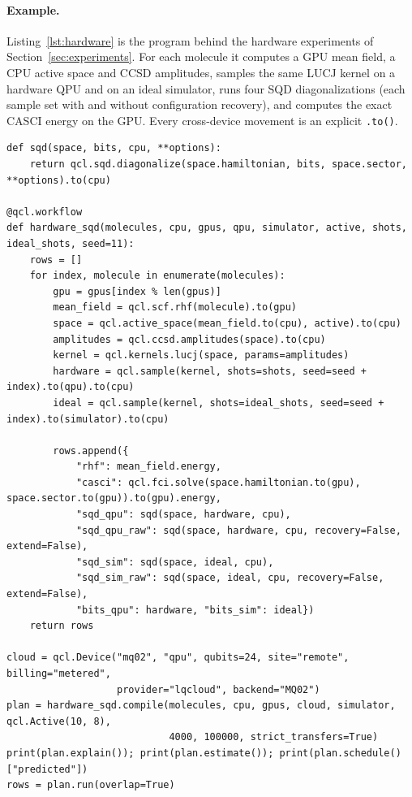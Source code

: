 \documentclass[10pt]{article}
\newcommand{\qcl}{QCL}
\newcommand{\code}[1]{\texttt{#1}}
\begin{document}
\paragraph{Example.} Listing~\ref{lst:hardware} is the program behind the hardware
experiments of Section~\ref{sec:experiments}. For each molecule it computes a GPU mean
field, a CPU active space and CCSD amplitudes, samples the same LUCJ kernel on a
hardware QPU and on an ideal simulator, runs four SQD diagonalizations (each sample set
with and without configuration recovery), and computes the exact CASCI energy on the GPU.
Every cross-device movement is an explicit \code{.to()}.

\begin{lstlisting}[caption={The hardware SQD experiment in \qcl{} (\code{qcl/apps/qpu\_sqd\_experiment.py}).},label=lst:hardware,float=t]
def sqd(space, bits, cpu, **options):
    return qcl.sqd.diagonalize(space.hamiltonian, bits, space.sector, **options).to(cpu)

@qcl.workflow
def hardware_sqd(molecules, cpu, gpus, qpu, simulator, active, shots, ideal_shots, seed=11):
    rows = []
    for index, molecule in enumerate(molecules):
        gpu = gpus[index % len(gpus)]
        mean_field = qcl.scf.rhf(molecule).to(gpu)
        space = qcl.active_space(mean_field.to(cpu), active).to(cpu)
        amplitudes = qcl.ccsd.amplitudes(space).to(cpu)
        kernel = qcl.kernels.lucj(space, params=amplitudes)
        hardware = qcl.sample(kernel, shots=shots, seed=seed + index).to(qpu).to(cpu)
        ideal = qcl.sample(kernel, shots=ideal_shots, seed=seed + index).to(simulator).to(cpu)

        rows.append({
            "rhf": mean_field.energy,
            "casci": qcl.fci.solve(space.hamiltonian.to(gpu), space.sector.to(gpu)).to(gpu).energy,
            "sqd_qpu": sqd(space, hardware, cpu),
            "sqd_qpu_raw": sqd(space, hardware, cpu, recovery=False, extend=False),
            "sqd_sim": sqd(space, ideal, cpu),
            "sqd_sim_raw": sqd(space, ideal, cpu, recovery=False, extend=False),
            "bits_qpu": hardware, "bits_sim": ideal})
    return rows

cloud = qcl.Device("mq02", "qpu", qubits=24, site="remote", billing="metered",
                   provider="lqcloud", backend="MQ02")
plan = hardware_sqd.compile(molecules, cpu, gpus, cloud, simulator, qcl.Active(10, 8),
                            4000, 100000, strict_transfers=True)
print(plan.explain()); print(plan.estimate()); print(plan.schedule()["predicted"])
rows = plan.run(overlap=True)
\end{lstlisting}
\end{document}
